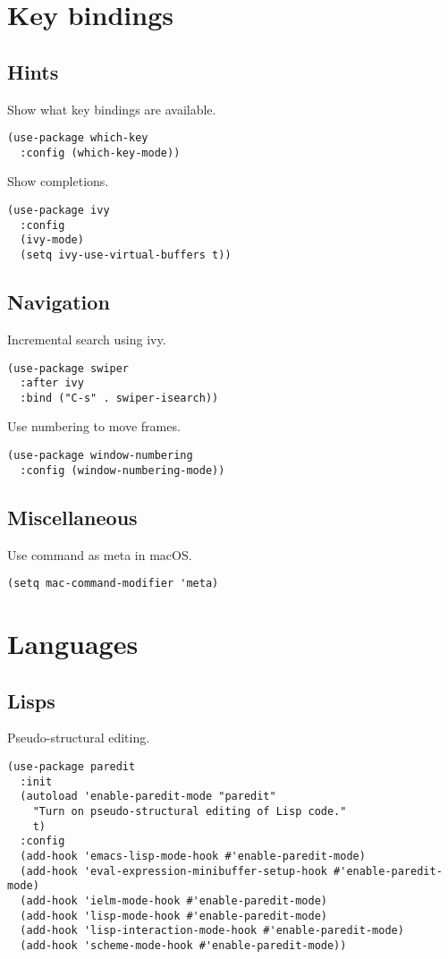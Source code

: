 \documentclass[11pt]{article}
\begin{document}
\section{Key bindings}
\label{sec:orgdcc1869}
\subsection{Hints}
\label{sec:orgbf868d2}
Show what key bindings are available.
\begin{verbatim}
(use-package which-key
  :config (which-key-mode))
\end{verbatim}

Show completions.
\begin{verbatim}
(use-package ivy
  :config
  (ivy-mode)
  (setq ivy-use-virtual-buffers t))
\end{verbatim}

\subsection{Navigation}
\label{sec:org55d48e4}
Incremental search using ivy.
\begin{verbatim}
(use-package swiper
  :after ivy
  :bind ("C-s" . swiper-isearch))
\end{verbatim}

Use numbering to move frames.
\begin{verbatim}
(use-package window-numbering
  :config (window-numbering-mode))
\end{verbatim}

\subsection{Miscellaneous}
\label{sec:org4b1637a}
Use command as meta in macOS.
\begin{verbatim}
(setq mac-command-modifier 'meta)
\end{verbatim}

\section{Languages}
\label{sec:org1df36b7}
\subsection{Lisps}
\label{sec:org06bb4f8}
Pseudo-structural editing.
\begin{verbatim}
(use-package paredit
  :init
  (autoload 'enable-paredit-mode "paredit"
    "Turn on pseudo-structural editing of Lisp code."
    t)
  :config
  (add-hook 'emacs-lisp-mode-hook #'enable-paredit-mode)
  (add-hook 'eval-expression-minibuffer-setup-hook #'enable-paredit-mode)
  (add-hook 'ielm-mode-hook #'enable-paredit-mode)
  (add-hook 'lisp-mode-hook #'enable-paredit-mode)
  (add-hook 'lisp-interaction-mode-hook #'enable-paredit-mode)
  (add-hook 'scheme-mode-hook #'enable-paredit-mode))
\end{verbatim}
\end{document}
